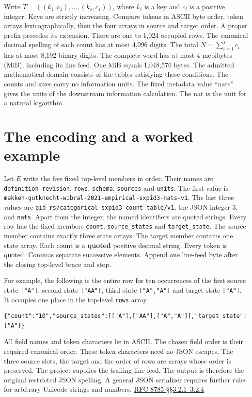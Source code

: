 \documentclass[11pt,a4paper]{article}
\begin{document}
Write \(T=((k_1,c_1),\ldots,(k_s,c_s))\), where \(k_i\) is a key and \(c_i\) is a positive integer. Keys are strictly increasing. Compare tokens in ASCII byte order, token arrays lexicographically, then the four arrays in source and target order. A proper prefix precedes its extension. There are one to 1,024 occupied rows. The canonical decimal spelling of each count has at most 4,096 digits. The total \(N=\sum_{i=1}^s c_i\) has at most 8,192 binary digits. The complete word has at most 4 mebibytes (MiB), including its line feed. One MiB equals 1,048,576 bytes. The admitted mathematical domain consists of the tables satisfying these conditions. The counts and sizes carry no information units. The fixed metadata value ``nats'' gives the units of the downstream information calculation. The nat is the unit for a natural logarithm.

\clearpage
\section{The encoding and a worked example}\label{the-encoding-and-a-worked-example}

Let \(E\) write the five fixed top-level members in order. Their names are \texttt{definition\_revision}, \texttt{rows}, \texttt{schema}, \texttt{sources} and \texttt{units}. The first value is \texttt{makkeh-gutknecht-wibral-2021-empirical-sxpid3-nats-v1}. The last three values are \texttt{pid-rs/categorical-sxpid3-count-table/v1}, the JSON integer 3, and \texttt{nats}. Apart from the integer, the named identifiers are quoted strings. Every row has the fixed members \texttt{count}, \texttt{source\_states} and \texttt{target\_state}. The source member contains exactly three state arrays. The target member contains one state array. Each count is a \textbf{quoted} positive decimal string. Every token is quoted. Commas separate successive elements. Append one line-feed byte after the closing top-level brace and stop.

For example, the following is the entire row for ten occurrences of the first source state \texttt{{[}"A"{]}}, second state \texttt{{[}"AA"{]}}, third state \texttt{{[}"A","A"{]}} and target state \texttt{{[}"A"{]}}. It occupies one place in the top-level \texttt{rows} array.

\begin{verbatim}
{"count":"10","source_states":[["A"],["AA"],["A","A"]],"target_state":["A"]}
\end{verbatim}

All field names and token characters lie in ASCII. The chosen field order is their required canonical order. These token characters need no JSON escapes. The three source slots, the target and the order of rows are arrays whose order is preserved. The project supplies the trailing line feed. The output is therefore the original restricted JSON spelling. A general JSON serializer requires further rules for arbitrary Unicode strings and numbers. \href{https://datatracker.ietf.org/doc/html/rfc8785\#section-3.2}{RFC 8785 §§3.2.1--3.2.4}
\end{document}
